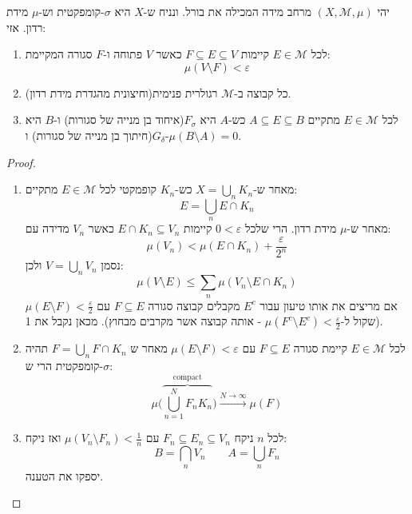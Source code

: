 \documentclass{tstextbook}
\begin{document}
\begin{lemma}
יהי \(\left( X,\mathcal{M,\mu} \right)\) מרחב מידה המכילה את בורל. ונניח ש-\(X\) היא \(\sigma\)-קומפקטית וש-\(\mu\) מידת רדון. אזי:

  \begin{enumerate}
    \item לכל \(E \in \mathcal{M}\) קיימות \(F\subseteq E \subseteq V\) כאשר \(V\) פתוחה ו-\(F\) סגורה המקיימת: 
$$\mu\left( V \setminus  F \right)<\varepsilon$$


    \item כל קבוצה ב-\(\mathcal{M}\) רגולרית פנימית(וחיצונית מהגדרת מידת רדון). 


    \item לכל \(E \in \mathcal{M}\) מתקיים \(A\subseteq E\subseteq B\) כש-\(A\) היא \(F_{\sigma}\)(איחוד בן מנייה של סגורות) ו-\(B\) היא \(G_{\delta}\)(חיתוך בן מנייה של סגורות) ו-\(\mu\left( B\setminus A \right)=0\). 


  \end{enumerate}
\end{lemma}
\begin{proof}
  \begin{enumerate}
    \item מאחר ש-\(X=\bigcup_{n}K_{n}\) כש-\(K_{n}\) קופמקטי לכל \(E \in \mathcal{M}\) מתקיים: 
$$E=\bigcup_{n}E \cap K_{n}$$
מאחר ש-\(\mu\) מידת רדון. הרי שלכל \(0<\varepsilon\) קיימות \(E \cap K_{n}\subseteq V_{n}\) כאשר \(V_{n}\) מדידה עם:
$$\mu(V_{n})< \mu\left( E\cap K_{n} \right)+\frac{\varepsilon}{2^{n}}$$
נסמן \(V=\bigcup_{n}V_{n}\) ולכן:
$$\mu\left( V\setminus  E \right)\leq \sum_{n}\mu\left( V_{n}\setminus  E\cap K_{n} \right)$$
אם מריצים את אותו טיעון עבור \(E^{c}\) מקבלים קבוצה סגורה \(F\subseteq E\) עם \(\mu\left( E \setminus F \right)< \frac{\varepsilon}{2}\)(שקול ל-\(\mu\left( F^{c}\setminus E^{c} \right)<\frac{\varepsilon}{2}\) - אותה קבוצה אשר מקרבים מבחוץ). מכאן נקבל את 1.


    \item לכל \(E \in \mathcal{M}\) קיימת סגורה \(F \subseteq E\) עם \(\mu\left( E \setminus F \right)<\varepsilon\) מאחר ש \(F=\bigcup_{n}F \cap K_{n}\) תהיה \(\sigma\)-קומפקטית הרי ש: 
$$\mu\bigg(\overbrace{ \bigcup_{n=1}^{N}F_{n}K_{n}  }^{ \text{compact} }\bigg)\xrightarrow{N\to \infty} \mu(F)$$


    \item לכל \(n\) ניקח \(F_{n}\subseteq E_{n}\subseteq V_{n}\) עם \(\mu\left( V_{n}\setminus F_{n} \right)<\frac{1}{n}\) ואז ניקח: 
$$B=\bigcap_{n}V_{n} \qquad  A= \bigcup_{n}F_{n}$$
יספקו את הטענה.


  \end{enumerate}
\end{proof}
\end{document}
